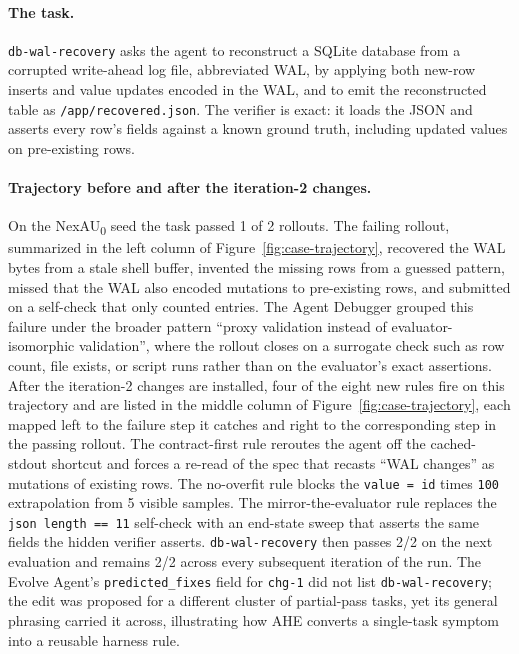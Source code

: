 \paragraph{The task.}
\texttt{db-wal-recovery} asks the agent to reconstruct a SQLite database from a corrupted write-ahead log file, abbreviated WAL, by applying both new-row inserts and value updates encoded in the WAL, and to emit the reconstructed table as \texttt{/app/recovered.json}. The verifier is exact: it loads the JSON and asserts every row's fields against a known ground truth, including updated values on pre-existing rows.

\paragraph{Trajectory before and after the iteration-2 changes.}
On the NexAU\textsubscript{0} seed the task passed 1 of 2 rollouts. The failing rollout, summarized in the left column of Figure~\ref{fig:case-trajectory}, recovered the WAL bytes from a stale shell buffer, invented the missing rows from a guessed pattern, missed that the WAL also encoded mutations to pre-existing rows, and submitted on a self-check that only counted entries. The Agent Debugger grouped this failure under the broader pattern ``proxy validation instead of evaluator-isomorphic validation'', where the rollout closes on a surrogate check such as row count, file exists, or script runs rather than on the evaluator's exact assertions. After the iteration-2 changes are installed, four of the eight new rules fire on this trajectory and are listed in the middle column of Figure~\ref{fig:case-trajectory}, each mapped left to the failure step it catches and right to the corresponding step in the passing rollout. The contract-first rule reroutes the agent off the cached-stdout shortcut and forces a re-read of the spec that recasts ``WAL changes'' as mutations of existing rows. The no-overfit rule blocks the \texttt{value = id} times \texttt{100} extrapolation from 5 visible samples. The mirror-the-evaluator rule replaces the \texttt{json length == 11} self-check with an end-state sweep that asserts the same fields the hidden verifier asserts. \texttt{db-wal-recovery} then passes 2/2 on the next evaluation and remains 2/2 across every subsequent iteration of the run. The Evolve Agent's \texttt{predicted\_fixes} field for \texttt{chg-1} did not list \texttt{db-wal-recovery}; the edit was proposed for a different cluster of partial-pass tasks, yet its general phrasing carried it across, illustrating how AHE converts a single-task symptom into a reusable harness rule.


